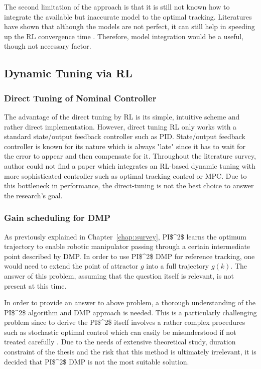 The second limitation of the approach is that it is still not known how to integrate the available but inaccurate model to the optimal tracking. Literatures have shown that although the models are not perfect, it can still help in speeding up the \ac {RL} convergence time \cite{Brujeni5669655} \cite{Grondman6096441}. Therefore, model integration would be a useful, though not necessary factor.

\subsection{Dynamic Tuning via \ac{RL}}
\subsubsection{Direct Tuning of Nominal Controller}
The advantage of the direct tuning by \ac{RL} is its simple, intuitive scheme and rather direct implementation. However, direct tuning \ac{RL} only works with a standard state/output feedback controller such as \ac{PID}. State/output feedback controller is known for its nature which is always "late" since it has to wait for the error to appear and then compensate for it. Throughout the literature survey, author could not find a paper which integrates an \ac{RL}-based dynamic tuning with more sophisticated controller such as optimal tracking control or \ac {MPC}. Due to this bottleneck in performance, the direct-tuning is not the best choice to answer the research's goal.
\subsubsection{Gain scheduling for \ac{DMP}}
As previously explained in Chapter~\ref{chap::survey}, \ac{PI$^2$} learns the optimum trajectory to enable robotic manipulator passing through a certain intermediate point described by \ac{DMP}. In order to use \ac{PI$^2$} \ac{DMP} for reference tracking, one would need to extend the point of attractor $g$ into a full trajectory $g(k)$. The answer of this problem, assuming that the question itself is relevant, is not present at this time.

In order to provide an answer to above problem, a thorough understanding of the \ac{PI$^2$} algorithm and \ac {DMP} approach is needed. This is a particularly challenging problem since to derive the \ac{PI$^2$} itself involves a rather complex procedures such as stochastic optimal control which can easily be misunderstood if not treated carefully \cite{Buchli2010}. Due to the needs of extensive theoretical study, duration constraint of the thesis and the risk that this method is ultimately irrelevant, it is decided that \ac {PI$^2$} \ac{DMP} is not the most suitable solution.

